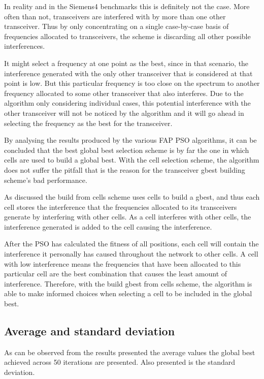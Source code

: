 In reality and in the Siemens4 benchmarks this is definitely not the case. More often than not, transceivers are interfered with by more than one other transceiver. Thus by only concentrating on a single case-by-case basis of frequencies allocated to transceivers, the scheme is discarding all other possible interferences. 

It might select a frequency at one point as the best, since in that scenario, the interference generated with the only other transceiver that is considered at that point is low. But this particular frequency is too close on the spectrum to another frequency allocated to some other transceiver that also interferes. Due to the algorithm only considering individual cases, this potential interference with the other transceiver will not be noticed by the algorithm and it will go ahead in selecting the frequency as the best for the transceiver.

By analysing the results produced by the various FAP PSO algorithms, it can be concluded that the best global best selection scheme is by far the one in which cells are used to build a global best. With the cell selection scheme, the algorithm does not suffer the pitfall that is the reason for the transceiver gbest building scheme's bad performance.

As discussed the build from cells scheme uses cells to build a gbest, and thus each cell stores the interference that the frequencies allocated to its transceivers generate by interfering with other cells. As a cell interferes with other cells, the interference generated is added to the cell causing the interference.

After the PSO has calculated the fitness of all positions, each cell will contain the interference it personally has caused throughout the network to other cells. A cell with low interference means the frequencies that have been allocated to this particular cell are the best combination that causes the least amount of interference. Therefore, with the build gbest from cells scheme, the algorithm is able to make informed choices when selecting a cell to be included in the global best. 
\subsection{Average and standard deviation}
As can be observed from the results presented the average values the global best achieved across 50 iterations are presented. Also presented is the standard deviation.

